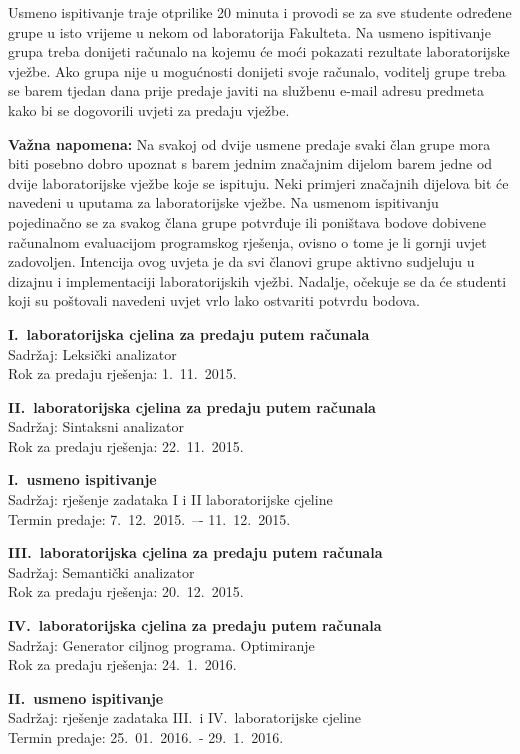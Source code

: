\documentclass[times, 12pt, utf8]{book}
\begin{document}
Usmeno ispitivanje traje otprilike 20 minuta i provodi se za sve studente određene grupe u isto vrijeme u nekom od laboratorija Fakulteta.
Na usmeno ispitivanje grupa treba donijeti računalo na kojemu će moći pokazati rezultate laboratorijske vježbe.
Ako grupa nije u mogućnosti donijeti svoje računalo, voditelj grupe treba se barem tjedan dana prije predaje javiti na službenu e-mail adresu predmeta kako bi se dogovorili uvjeti za predaju vježbe.

\textbf{Važna napomena:} Na svakoj od dvije usmene predaje svaki član grupe mora biti posebno dobro upoznat s barem jednim značajnim dijelom barem jedne od dvije laboratorijske vježbe koje se ispituju.
Neki primjeri značajnih dijelova bit će navedeni u uputama za laboratorijske vježbe.
Na usmenom ispitivanju pojedinačno se za svakog člana grupe potvrđuje ili poništava bodove dobivene računalnom evaluacijom programskog rješenja, ovisno o tome je li gornji uvjet zadovoljen.
Intencija ovog uvjeta je da svi članovi grupe aktivno sudjeluju u dizajnu i implementaciji laboratorijskih vježbi.
Nadalje, očekuje se da će studenti koji su poštovali navedeni uvjet vrlo lako ostvariti potvrdu bodova.

\textbf{I.~laboratorijska cjelina za predaju putem računala} \\
Sadržaj: Leksički analizator \\
Rok za predaju rješenja: 1.~11.~2015.

\textbf{II.~laboratorijska cjelina za predaju putem računala} \\
Sadržaj: Sintaksni analizator \\
Rok za predaju rješenja: 22.~11.~2015.

\textbf{I.~usmeno ispitivanje} \\
Sadržaj: rješenje zadataka I i II laboratorijske cjeline  \\
Termin predaje: 7.~12.~2015.~–- 11.~12.~2015.

\textbf{III.~laboratorijska cjelina za predaju putem računala} \\
Sadržaj: Semantički analizator \\
Rok za predaju rješenja: 20.~12.~2015.

\textbf{IV.~laboratorijska cjelina za predaju putem računala} \\
Sadržaj: Generator ciljnog programa. Optimiranje \\
Rok za predaju rješenja: 24.~1.~2016.

\textbf{II.~usmeno ispitivanje} \\
Sadržaj: rješenje zadataka III.~i IV.~laboratorijske cjeline  \\
Termin predaje: 25.~01.~2016.~- 29.~1.~2016.
\end{document}
